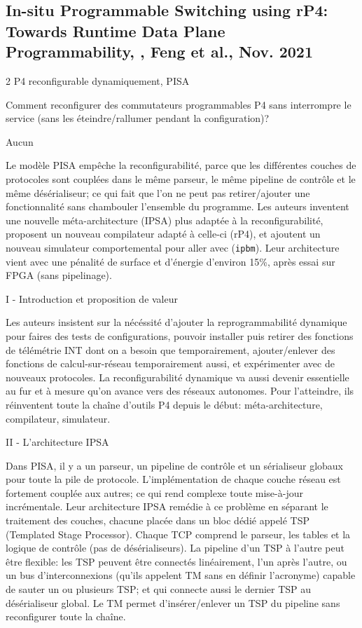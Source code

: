 
\subsection{In-situ Programmable Switching using rP4: Towards Runtime Data Plane Programmability, \cite{feng_situ_2021}, Feng et al., Nov. 2021}
 2
 P4 reconfigurable dynamiquement, PISA

 Comment reconfigurer des commutateurs programmables P4 sans interrompre le service (sans les éteindre/rallumer pendant la configuration)?

 Aucun

 Le modèle PISA empêche la reconfigurabilité, parce que les différentes couches de protocoles sont couplées dans le même parseur, le même pipeline de contrôle et le même désérialiseur; ce qui fait que l'on ne peut pas retirer/ajouter une fonctionnalité sans chambouler l'ensemble du programme. Les auteurs inventent une nouvelle méta-architecture (IPSA) plus adaptée à la reconfigurabilité, proposent un nouveau compilateur adapté à celle-ci (rP4), et ajoutent un nouveau simulateur comportemental pour aller avec (\texttt{ipbm}). Leur architecture vient avec une pénalité de surface et d'énergie d'environ 15\%, après essai sur FPGA (sans pipelinage).


I - Introduction et proposition de valeur

Les auteurs insistent sur la nécéssité d'ajouter la reprogrammabilité dynamique pour faires des tests de configurations, pouvoir installer puis retirer des fonctions de télémétrie INT dont on a besoin que temporairement, ajouter/enlever des fonctions de calcul-sur-réseau temporairement aussi, et expérimenter avec de nouveaux protocoles. La reconfigurabilité dynamique va aussi devenir essentielle au fur et à mesure qu'on avance vers des réseaux autonomes. Pour l'atteindre, ils réinventent toute la chaîne d'outils P4 depuis le début: méta-architecture, compilateur, simulateur.

II - L'architecture IPSA

Dans PISA, il y a un parseur, un pipeline de contrôle et un sérialiseur globaux pour toute la pile de protocole. L'implémentation de chaque couche réseau est fortement couplée aux autres; ce qui rend complexe toute mise-à-jour incrémentale. Leur architecture IPSA remédie à ce problème en séparant le traitement des couches, chacune placée dans un bloc dédié appelé TSP (Templated Stage Processor). Chaque TCP comprend le parseur, les tables et la logique de contrôle (pas de désérialiseurs). La pipeline d'un TSP à l'autre peut être flexible: les TSP peuvent être connectés linéairement, l'un après l'autre, ou un bus d'interconnexions (qu'ils appelent TM sans en définir l'acronyme) capable de sauter un ou plusieurs TSP; et qui connecte aussi le dernier TSP au désérialiseur global. Le TM permet d'insérer/enlever un TSP du pipeline sans reconfigurer toute la chaîne.

